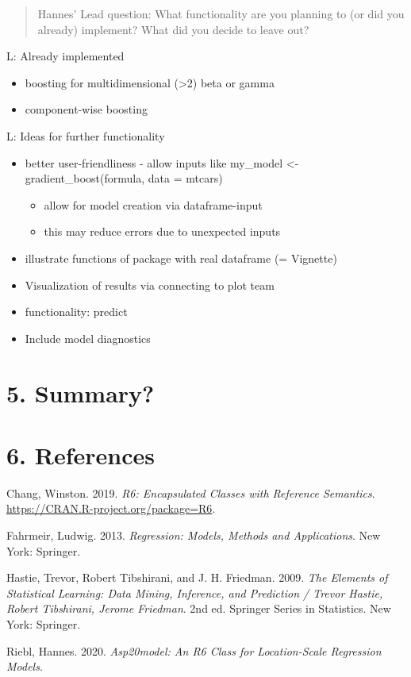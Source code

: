 \documentclass[
]{report}
\providecommand{\tightlist}{%
  \setlength{\itemsep}{0pt}\setlength{\parskip}{0pt}}
\begin{document}
\begin{quote}
Hannes' Lead question: What functionality are you planning to (or did
you already) implement? What did you decide to leave out?
\end{quote}

L: Already implemented

\begin{itemize}
\tightlist
\item
  boosting for multidimensional (\textgreater2) beta or gamma
\item
  component-wise boosting
\end{itemize}

L: Ideas for further functionality

\begin{itemize}
\tightlist
\item
  better user-friendliness - allow inputs like my\_model \textless-
  gradient\_boost(formula, data = mtcars)

  \begin{itemize}
  \tightlist
  \item
    allow for model creation via dataframe-input
  \item
    this may reduce errors due to unexpected inputs
  \end{itemize}
\item
  illustrate functions of package with real dataframe (= Vignette)
\item
  Visualization of results via connecting to plot team
\item
  functionality: predict
\item
  Include model diagnostics
\end{itemize}

\hypertarget{summary}{%
\chapter{5. Summary?}\label{summary}}

\hypertarget{references}{%
\chapter*{6. References}\label{references}}

\hypertarget{refs}{}
\leavevmode\hypertarget{ref-R-R6}{}%
Chang, Winston. 2019. \emph{R6: Encapsulated Classes with Reference
Semantics}. \url{https://CRAN.R-project.org/package=R6}.

\leavevmode\hypertarget{ref-Fahrmeir.2013}{}%
Fahrmeir, Ludwig. 2013. \emph{Regression: Models, Methods and
Applications}. New York: Springer.

\leavevmode\hypertarget{ref-Hastie.2009}{}%
Hastie, Trevor, Robert Tibshirani, and J. H. Friedman. 2009. \emph{The
Elements of Statistical Learning: Data Mining, Inference, and Prediction
/ Trevor Hastie, Robert Tibshirani, Jerome Friedman}. 2nd ed. Springer
Series in Statistics. New York: Springer.

\leavevmode\hypertarget{ref-R-asp20model}{}%
Riebl, Hannes. 2020. \emph{Asp20model: An R6 Class for Location-Scale
Regression Models}.
\end{document}
